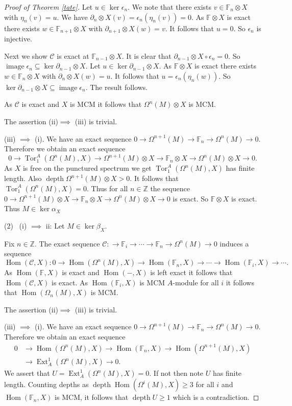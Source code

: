 \documentclass{amsart}
\newcommand{\Z}{\mathbb{Z} }
\newcommand{\Fb}{\mathbb{F} }
\newcommand{\rt}{\rightarrow}
\newcommand{\image}{\operatorname{image}}
\newcommand{\depth}{\operatorname{depth}}
\newcommand{\Hom}{\operatorname{Hom}}
\newcommand{\Ext}{\operatorname{Ext}}
\newcommand{\Tor}{\operatorname{Tor}}
\theoremstyle{plain}
\theoremstyle{definition}
\theoremstyle{remark}
\begin{document}
{\begin{proof}[Proof of Theorem \ref{tate}]
Let $u \in \ker \epsilon_n$. We note that there exists $v \in \Fb_n\otimes X$  with $\eta_n(v) = u$. We have $\partial_n\otimes X(v) = \epsilon_n(\eta_n(v)) = 0$. As $\Fb\otimes X$ is exact there exists $w \in \Fb_{n+1}\otimes X $ with $\partial_{n+1}\otimes X(w) = v$. It follows that $u = 0$.  So $\epsilon_n$ is injective.

Next we show $\mathcal{C}$ is exact at $\Fb_{n-1}\otimes X$.
It is clear that $\partial_{n-1}\otimes X\circ \epsilon_n = 0$. So $\image \epsilon_n \subseteq \ker \partial_{n-1}\otimes X$. Let $u \in \ker \partial_{n-1}\otimes X$. As $\Fb\otimes X$ is exact there exists $w \in \Fb_{n}\otimes X $ with $\partial_{n}\otimes X(w) = u$. It follows that $u = \epsilon_n(\eta_n(w))$.  So $\ker \partial_{n-1}\otimes X  \subseteq \image \epsilon_n$. The result follows.

As $\mathcal{C}$ is exact and $X$ is MCM it follows that $ \Omega^n(M) \otimes X$ is MCM.

The assertion (ii)$ \implies$ (iii) is trivial.

(iii) $\implies$ (i). We have an exact sequence $ 0 \rt \Omega^{n+1}(M) \rt \Fb_{n} \rt \Omega^n(M) \rt 0$. Therefore we obtain
an exact sequence
$$ 0 \rt \Tor^A_1(\Omega^n(M), X) \rt \Omega^{n+1}(M)\otimes X \rt \Fb_{n}\otimes X \rt \Omega^n(M)\otimes X \rt 0. $$
As $X$ is free on the punctured spectrum we get $\Tor^A_1(\Omega^n(M), X)$ has finite length. Also $\depth \Omega^{n+1}(M)\otimes X > 0$. It follows that $\Tor^A_1(\Omega^n(M), X) = 0$. Thus for all $n \in \Z$ the sequence $ 0  \rt \Omega^{n+1}(M)\otimes X \rt \Fb_{n}\otimes X \rt \Omega^n(M)\otimes X \rt 0$ is exact. So $\Fb\otimes X$ is exact. Thus $M \in \ker \alpha_X$

(2) \
(i) $\implies$ ii: Let $M \in \ker \beta_X$.

Fix $n \in  \Z$. The exact sequence $\mathcal{C} \colon \rt \Fb_i \rt \cdots \rt \Fb_n \rt \Omega^n(M) \rt 0 $ induces a sequence
$$\Hom(\mathcal{C}, X) \colon 0\rt \Hom(\Omega^n(M), X) \rt \Hom(\Fb_n, X) \rt \cdots \rt \Hom(\Fb_i, X) \rt \cdots.$$
As $\Hom(\Fb, X)$ is exact and $\Hom(-, X)$ is left exact it follows that $\Hom(\mathcal{C}, X) $ is exact.
As $\Hom(\Fb_i, X) $ is MCM $A$-module for all $i$ it follows that $\Hom(\Omega_n(M), X)$ is MCM.

The assertion (ii)$ \implies$ (iii) is trivial.

(iii) $\implies$ (i). We have an exact sequence $ 0 \rt \Omega^{n+1}(M) \rt \Fb_{n} \rt \Omega^n(M) \rt 0$. Therefore we obtain
an exact sequence
\begin{align*}
   0 &\rt \Hom(\Omega^n(M), X) \rt \Hom(\Fb_n, X) \rt \Hom(\Omega^{n+1}(M), X)  \\
   &\rt \Ext_A^1(\Omega^n(M), X) \rt 0.
 \end{align*}
We assert that $U = \Ext_A^1(\Omega^n(M), X) = 0$. If not then note $U$ has finite length.
Counting depths as $\depth \Hom(\Omega^i(M), X) \geq 3$ for all $i$ and $\Hom(\Fb_n, X)$ is MCM, it follows that $\depth U \geq 1$ which is a contradiction.


\end{proof}}
\end{document}
